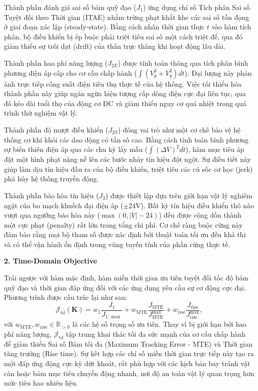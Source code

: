 \documentclass[conference, a4paper]{IEEEtran}
\begin{document}
Thành phần đánh giá sai số bám quỹ đạo ($J_1$) ứng dụng chỉ số Tích phân Sai số Tuyệt đối theo Thời gian (ITAE) nhằm trừng phạt khắt khe các sai số tồn đọng ở giai đoạn xác lập (steady-state). Bằng cách nhân thời gian thực $t$ vào hàm tích phân, bộ điều khiển bị ép buộc phải triệt tiêu sai số một cách triệt để, qua đó giảm thiểu sự trôi dạt (drift) của thân trực thăng khi hoạt động lâu dài. 

Thành phần hao phí năng lượng ($J_{2E}$) được tính toán thông qua tích phân bình phương điện áp cấp cho cơ cấu chấp hành ($\int (V_p^2 + V_y^2) dt$). Đại lượng này phản ánh trực tiếp công suất điện tiêu thụ thực tế của hệ thống. Việc tối thiểu hóa thành phần này giúp ngăn ngừa hiện tượng cấp dòng điện cực đại liên tục, qua đó kéo dài tuổi thọ của động cơ DC và giảm thiểu nguy cơ quá nhiệt trong quá trình thử nghiệm vật lý.

Thành phần độ mượt điều khiển ($J_{2S}$) đóng vai trò như một cơ chế bảo vệ hệ thống cơ khí khỏi các dao động có tần số cao. Bằng cách tính toán bình phương sự biến thiên điện áp qua các chu kỳ lấy mẫu ($\int (\Delta V)^2 dt$), hàm mục tiêu áp đặt một hình phạt nặng nề lên các bước nhảy tín hiệu đột ngột. Sự điều tiết này giúp làm dịu tín hiệu đầu ra của bộ điều khiển, triệt tiêu các cú sốc cơ học (jerk) phá hủy hệ thống truyền động.

Thành phần bão hòa tín hiệu ($J_3$) được thiết lập dựa trên giới hạn vật lý nghiêm ngặt của bo mạch khuếch đại điện áp ($\pm 24\text{V}$). Bất kỳ tín hiệu điều khiển thô nào vượt qua ngưỡng bão hòa này ($\max(0, |V| - 24)$) đều được cộng dồn thành một cực phạt (penalty) rất lớn trong tổng chi phí. Cơ chế ràng buộc cứng này đảm bảo rằng mọi bộ tham số được xác định bởi thuật toán tối ưu đều khả thi và có thể vận hành ổn định trong vùng tuyến tính của phần cứng thực tế.

\textbf{2. Time-Domain Objective}

Trái ngược với hàm mặc định, hàm miền thời gian ưu tiên tuyệt đối tốc độ bám quỹ đạo và thời gian đáp ứng đối với các ứng dụng yêu cầu sự cơ động cực đại. Phương trình được cấu trúc lại như sau:
\begin{equation}
\mathcal{J}_{\text{td}}(\boldsymbol{K}) = w_{1} \frac{J_1}{J_{1,\max}} + w_{\text{MTE}} \frac{J_{\text{MTE}}}{J_{\text{MTE}}^{\max}} + w_{\text{rise}} \frac{J_{\text{rise}}}{J_{\text{rise}}^{\max}},
\end{equation}
với $w_{\text{MTE}}, w_{\text{rise}} \in \mathbb{R}_{>0}$ là các hệ số trọng số ưu tiên. Thay vì bị giới hạn bởi hao phí năng lượng, $\mathcal{J}_{\text{td}}$ tập trung khai thác tối đa sức mạnh của cơ cấu chấp hành để giảm thiểu Sai số Bám tối đa (Maximum Tracking Error - MTE) và Thời gian tăng trưởng (Rise time). Sự kết hợp các chỉ số miền thời gian trực tiếp này tạo ra một đáp ứng động cực kỳ dứt khoát, rất phù hợp với các kịch bản bay tránh vật cản hoặc bám mục tiêu chuyển động nhanh, nơi độ an toàn vật lý quan trọng hơn mức tiêu hao nhiên liệu.
\end{document}
